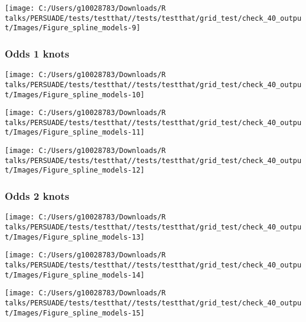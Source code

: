 \documentclass[
]{article}
\begin{document}
\begin{flushleft}\texttt{[image: C:/Users/g10028783/Downloads/R talks/PERSUADE/tests/testthat//tests/testthat/grid\_test/check\_40\_output/Images/Figure\_spline\_models-9]} \end{flushleft}

\clearpage

\subsubsection{Odds 1 knots}\label{odds-1-knots}

\begin{flushleft}\texttt{[image: C:/Users/g10028783/Downloads/R talks/PERSUADE/tests/testthat//tests/testthat/grid\_test/check\_40\_output/Images/Figure\_spline\_models-10]} \end{flushleft}

\begin{flushleft}\texttt{[image: C:/Users/g10028783/Downloads/R talks/PERSUADE/tests/testthat//tests/testthat/grid\_test/check\_40\_output/Images/Figure\_spline\_models-11]} \end{flushleft}

\begin{flushleft}\texttt{[image: C:/Users/g10028783/Downloads/R talks/PERSUADE/tests/testthat//tests/testthat/grid\_test/check\_40\_output/Images/Figure\_spline\_models-12]} \end{flushleft}

\clearpage

\subsubsection{Odds 2 knots}\label{odds-2-knots}

\begin{flushleft}\texttt{[image: C:/Users/g10028783/Downloads/R talks/PERSUADE/tests/testthat//tests/testthat/grid\_test/check\_40\_output/Images/Figure\_spline\_models-13]} \end{flushleft}

\begin{flushleft}\texttt{[image: C:/Users/g10028783/Downloads/R talks/PERSUADE/tests/testthat//tests/testthat/grid\_test/check\_40\_output/Images/Figure\_spline\_models-14]} \end{flushleft}

\begin{flushleft}\texttt{[image: C:/Users/g10028783/Downloads/R talks/PERSUADE/tests/testthat//tests/testthat/grid\_test/check\_40\_output/Images/Figure\_spline\_models-15]} \end{flushleft}
\end{document}
